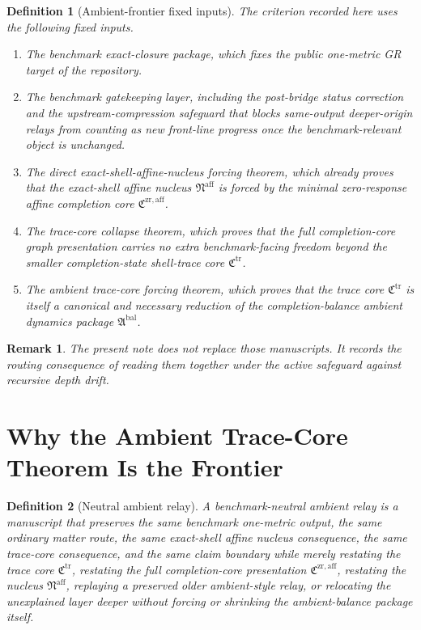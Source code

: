 \documentclass[11pt]{article}
\newcommand{\CompletionCore}{\mathfrak C^{\mathrm{zr,aff}}}
\newcommand{\TraceCore}{\mathfrak C^{\mathrm{tr}}}
\newcommand{\AffineNucleus}{\mathfrak N^{\mathrm{aff}}}
\newcommand{\AmbientPackage}{\mathfrak A^{\mathrm{bal}}}
\newtheorem{definition}{Definition}
\newtheorem{remark}{Remark}
\begin{document}
\begin{definition}[Ambient-frontier fixed inputs]
The criterion recorded here uses the following fixed inputs.
\begin{enumerate}
    \item The benchmark exact-closure package, which fixes the public one-metric GR target of the repository.
    \item The benchmark gatekeeping layer, including the post-bridge status correction and the upstream-compression safeguard that blocks same-output deeper-origin relays from counting as new front-line progress once the benchmark-relevant object is unchanged.
    \item The direct exact-shell-affine-nucleus forcing theorem, which already proves that the exact-shell affine nucleus \(\AffineNucleus\) is forced by the minimal zero-response affine completion core \(\CompletionCore\).
    \item The trace-core collapse theorem, which proves that the full completion-core graph presentation carries no extra benchmark-facing freedom beyond the smaller completion-state shell-trace core \(\TraceCore\).
    \item The ambient trace-core forcing theorem, which proves that the trace core \(\TraceCore\) is itself a canonical and necessary reduction of the completion-balance ambient dynamics package \(\AmbientPackage\).
\end{enumerate}
\end{definition}

\begin{remark}
The present note does not replace those manuscripts. It records the routing consequence of reading them together under the active safeguard against recursive depth drift.
\end{remark}

\section{Why the Ambient Trace-Core Theorem Is the Frontier}

\begin{definition}[Neutral ambient relay]
A \emph{benchmark-neutral ambient relay} is a manuscript that preserves the same benchmark one-metric output, the same ordinary matter route, the same exact-shell affine nucleus consequence, the same trace-core consequence, and the same claim boundary while merely restating the trace core \(\TraceCore\), restating the full completion-core presentation \(\CompletionCore\), restating the nucleus \(\AffineNucleus\), replaying a preserved older ambient-style relay, or relocating the unexplained layer deeper without forcing or shrinking the ambient-balance package itself.
\end{definition}
\end{document}
